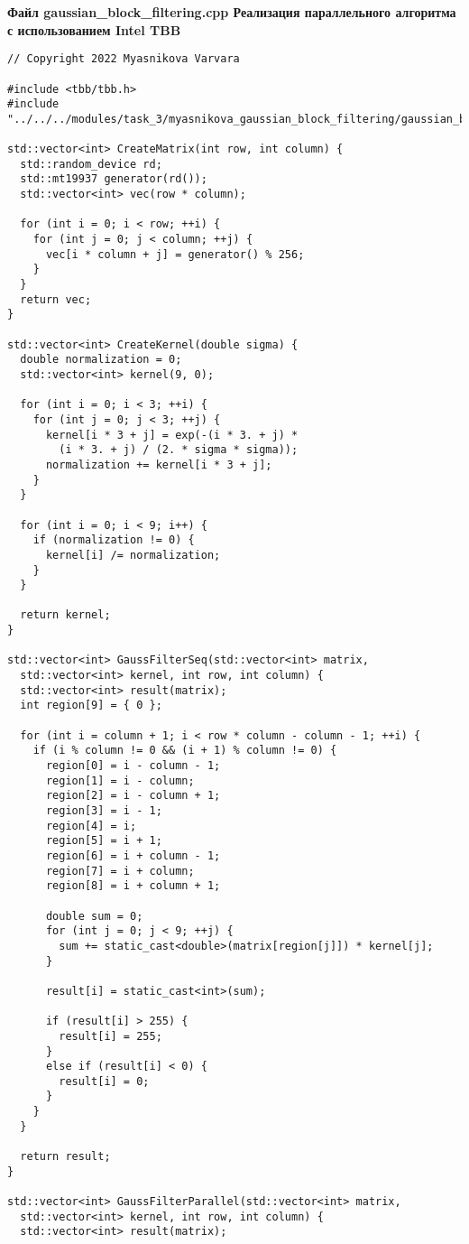 \documentclass{report}
\begin{document}
\newpage
\textbf{ Файл gaussian\_block\_filtering.cpp Реализация параллельного алгоритма с использованием Intel TBB}
\begin{lstlisting}
// Copyright 2022 Myasnikova Varvara

#include <tbb/tbb.h>
#include "../../../modules/task_3/myasnikova_gaussian_block_filtering/gaussian_block_filtering.h"

std::vector<int> CreateMatrix(int row, int column) {
  std::random_device rd;
  std::mt19937 generator(rd());
  std::vector<int> vec(row * column);

  for (int i = 0; i < row; ++i) {
    for (int j = 0; j < column; ++j) {
      vec[i * column + j] = generator() % 256;
    }
  }
  return vec;
}

std::vector<int> CreateKernel(double sigma) {
  double normalization = 0;
  std::vector<int> kernel(9, 0);

  for (int i = 0; i < 3; ++i) {
    for (int j = 0; j < 3; ++j) {
      kernel[i * 3 + j] = exp(-(i * 3. + j) *
        (i * 3. + j) / (2. * sigma * sigma));
      normalization += kernel[i * 3 + j];
    }
  }

  for (int i = 0; i < 9; i++) {
    if (normalization != 0) {
      kernel[i] /= normalization;
    }
  }

  return kernel;
}

std::vector<int> GaussFilterSeq(std::vector<int> matrix,
  std::vector<int> kernel, int row, int column) {
  std::vector<int> result(matrix);
  int region[9] = { 0 };

  for (int i = column + 1; i < row * column - column - 1; ++i) {
    if (i % column != 0 && (i + 1) % column != 0) {
      region[0] = i - column - 1;
      region[1] = i - column;
      region[2] = i - column + 1;
      region[3] = i - 1;
      region[4] = i;
      region[5] = i + 1;
      region[6] = i + column - 1;
      region[7] = i + column;
      region[8] = i + column + 1;

      double sum = 0;
      for (int j = 0; j < 9; ++j) {
        sum += static_cast<double>(matrix[region[j]]) * kernel[j];
      }

      result[i] = static_cast<int>(sum);

      if (result[i] > 255) {
        result[i] = 255;
      }
      else if (result[i] < 0) {
        result[i] = 0;
      }
    }
  }

  return result;
}

std::vector<int> GaussFilterParallel(std::vector<int> matrix,
  std::vector<int> kernel, int row, int column) {
  std::vector<int> result(matrix);


\end{lstlisting}
\end{document}

